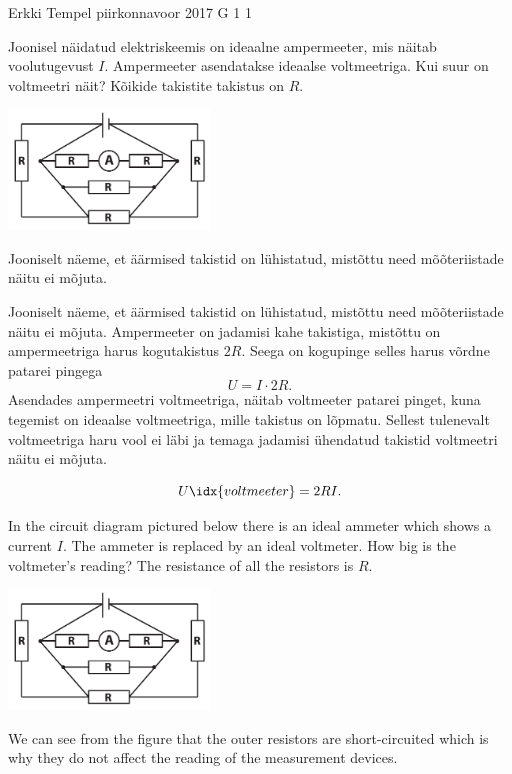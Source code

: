{Erkki Tempel} %
{piirkonnavoor} %
{2017} %
{G 1} %
{1} %
{
\ifStatement
Joonisel näidatud elektriskeemis on ideaalne ampermeeter, mis näitab voolutugevust $I$. Ampermeeter asendatakse ideaalse voltmeetriga. Kui suur on voltmeetri näit? Kõikide takistite takistus on $R$.
\begin{center}
	\includegraphics[width=0.4\textwidth]{2017-v2g-01-skeem}
\end{center}
\fi


\ifHint
Jooniselt näeme, et äärmised takistid on lühistatud, mistõttu need mõõteriistade näitu ei mõjuta.
\fi


\ifSolution
Jooniselt näeme, et äärmised takistid on lühistatud, mistõttu need mõõteriistade näitu ei mõjuta. Ampermeeter on jadamisi kahe takistiga, mistõttu on ampermeetriga harus kogutakistus $2R$. Seega on kogupinge selles harus võrdne patarei pingega
\[ U = I\cdot 2R.\]
Asendades ampermeetri voltmeetriga, näitab voltmeeter patarei pinget, kuna tegemist on ideaalse voltmeetriga, mille takistus on lõpmatu. Sellest tulenevalt voltmeetriga haru vool ei läbi ja temaga jadamisi ühendatud takistid voltmeetri näitu ei mõjuta.

\[ U\idx{voltmeeter} = 2RI.\]
\fi


\ifEngStatement
In the circuit diagram pictured below there is an ideal ammeter which shows a current $I$. The ammeter is replaced by an ideal voltmeter. How big is the voltmeter’s reading? The resistance of all the resistors is $R$.
\begin{center}
	\includegraphics[width=0.4\textwidth]{2017-v2g-01-skeem}
\end{center}
\fi


\ifEngHint
We can see from the figure that the outer resistors are short-circuited which is why they do not affect the reading of the measurement devices.
\fi


}
